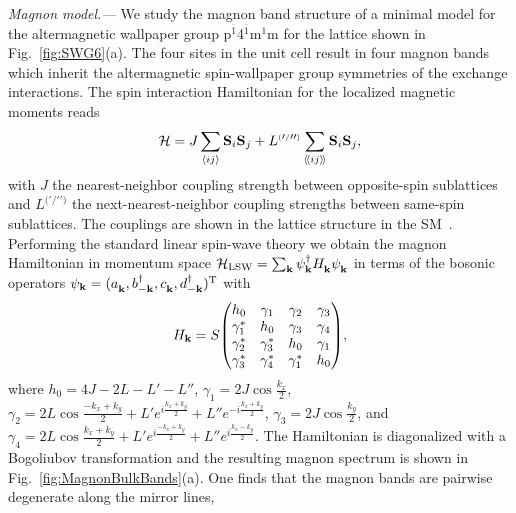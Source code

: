\documentclass[aps,prb,twocolumn,amsmath,amssymb,floatfix]{revtex4-2}
\begin{document}
\textit{Magnon model.---}
We study the magnon band structure of a minimal model for the altermagnetic wallpaper group p$^{\overline{1}}$4$^{\overline{1}}$m$^1$m for the lattice shown in Fig.~\ref{fig:SWG6}(a). The four sites in the unit cell result in four magnon bands which inherit the altermagnetic spin-wallpaper group symmetries of the exchange interactions. 
The spin interaction Hamiltonian for the localized magnetic moments reads
\begin{align}
    \mathcal{H} = J \sum_{\braket{ij}} \mathbf{S}_i \mathbf{S}_j + L^{\scriptscriptstyle(\scriptstyle\prime\scriptscriptstyle / \scriptstyle\prime\prime\scriptscriptstyle)} \sum_{\braket{\hspace{-.05cm}\braket{ij}\hspace{-.05cm}}} \mathbf{S}_i \mathbf{S}_j,
\end{align}
with $J$ the nearest-neighbor coupling strength between opposite-spin sublattices and $L^{\scriptscriptstyle(\scriptstyle\prime\scriptscriptstyle / \scriptstyle\prime\prime\scriptscriptstyle)}$ the next-nearest-neighbor coupling strengths between same-spin sublattices. 
The couplings are shown in the lattice structure in the SM~\cite{sm_note}.
Performing the standard linear spin-wave theory we obtain the magnon Hamiltonian in momentum space $\mathcal{H}_\mathrm{LSW} = \sum_\mathbf{k} \psi_\mathbf{k}^\dagger H_\mathbf{k}^{\vphantom{\dagger}} \psi_\mathbf{k}^{\vphantom{\dagger}} $ in terms of the bosonic operators $\psi_\mathbf{k} = (a_\mathbf{k}^{\vphantom{\dagger}},b_{-\mathbf{k}}^\dagger,c_\mathbf{k}^{\vphantom{\dagger}},d_{-\mathbf{k}}^\dagger)^{\text{T}}$ with
\begin{align}\label{eq:LSWH}
    H_\mathbf{k} = S \mqty(h_0 & \gamma_1 & \gamma_2 & \gamma_3 \\
                         \gamma_1^* & h_0 & \gamma_3 & \gamma_4 \\
                         \gamma_2^* & \gamma_3^* & h_0 & \gamma_1 \\
                         \gamma_3^* & \gamma_4^* & \gamma_1^* & h_0 ),
\end{align}
where $h_0 = 4J-2L-L'-L''$, $\gamma_1 = 2J\cos\tfrac{k_x}{2}$, $\gamma_2 = 2L\cos\tfrac{-k_x+k_y}{2} + L'e^{i\tfrac{k_x+k_y}{2}} + L''e^{-i\tfrac{k_x+k_y}{2}}$, $\gamma_3 = 2J\cos\tfrac{k_y}{2}$, and $\gamma_4 = 2L\cos\tfrac{k_x+k_y}{2} + L'e^{i\tfrac{-k_x+k_y}{2}} + L''e^{i\tfrac{k_x-k_y}{2}}$. The Hamiltonian is diagonalized with a Bogoliubov transformation \cite{Colpa1978} and the resulting magnon spectrum is shown in Fig.~\ref{fig:MagnonBulkBands}(a). One finds that the magnon bands are pairwise degenerate along the mirror lines,
\end{document}
